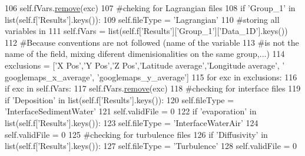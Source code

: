\begin{DoxyCode}
106                         self.fVars.\mbox{\hyperlink{namespaceabstract__linkedlist__mod_a9f4028744d1ca6536e28c76d2795ace3}{remove}}(exc)
107             \textcolor{comment}{#cheking for Lagrangian files }
108             \textcolor{keywordflow}{if} \textcolor{stringliteral}{'Group\_1'} \textcolor{keywordflow}{in} list(self.f[\textcolor{stringliteral}{'Results'}].keys()):
109                 self.fileType = \textcolor{stringliteral}{'Lagrangian'}
110                 \textcolor{comment}{#storing all variables in }
111                 self.fVars = list(self.f[\textcolor{stringliteral}{'Results'}][\textcolor{stringliteral}{'Group\_1'}][\textcolor{stringliteral}{'Data\_1D'}].keys())
112                 \textcolor{comment}{#Because conventions are not followed (name of the variable }
113                 \textcolor{comment}{#is not the name of the field, mixing diferent dimenisionalities on the same group,...)}
114                 exclusions = [\textcolor{stringliteral}{'X Pos'},\textcolor{stringliteral}{'Y Pos'},\textcolor{stringliteral}{'Z Pos'},\textcolor{stringliteral}{'Latitude average'},\textcolor{stringliteral}{'Longitude average'}, \textcolor{stringliteral}{'
      googlemaps\_x\_average'}, \textcolor{stringliteral}{'googlemaps\_y\_average'}]
115                 \textcolor{keywordflow}{for} exc \textcolor{keywordflow}{in} exclusions:
116                     \textcolor{keywordflow}{if} exc \textcolor{keywordflow}{in} self.fVars:
117                         self.fVars.\mbox{\hyperlink{namespaceabstract__linkedlist__mod_a9f4028744d1ca6536e28c76d2795ace3}{remove}}(exc)
118             \textcolor{comment}{#checking for interface files}
119             \textcolor{keywordflow}{if} \textcolor{stringliteral}{'Deposition'} \textcolor{keywordflow}{in} list(self.f[\textcolor{stringliteral}{'Results'}].keys()):
120                 self.fileType = \textcolor{stringliteral}{'InterfaceSedimentWater'}
121                 self.validFile = 0
122             \textcolor{keywordflow}{if} \textcolor{stringliteral}{'evaporation'} \textcolor{keywordflow}{in} list(self.f[\textcolor{stringliteral}{'Results'}].keys()):
123                 self.fileType = \textcolor{stringliteral}{'InterfaceWaterAir'}
124                 self.validFile = 0
125             \textcolor{comment}{#checking for turbulence files}
126             \textcolor{keywordflow}{if} \textcolor{stringliteral}{'Diffusivity'} \textcolor{keywordflow}{in} list(self.f[\textcolor{stringliteral}{'Results'}].keys()):
127                 self.fileType = \textcolor{stringliteral}{'Turbulence'}
128                 self.validFile = 0

\end{DoxyCode}
